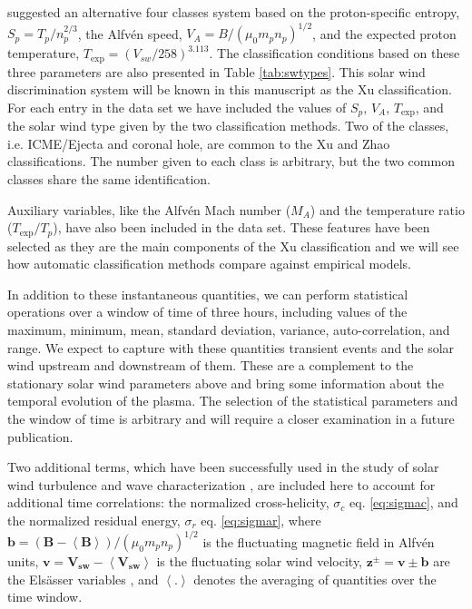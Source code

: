 \citep{Xu2015b} suggested an alternative four classes system based on the proton-specific entropy, $S_p = T_p/n_p^{2/3}$, the Alfv\'en speed, $V_A = B / (\mu_0 m_p n_p)^{1/2}$, and the expected proton temperature, $T_\text{exp} = (V_{sw}/258)^{3.113}$. The classification conditions based on these three parameters are also presented in Table \ref{tab:swtypes}. This solar wind discrimination system will be known in this manuscript as the Xu classification\citep{Xu2015b}. For each entry in the data set we have included the values of $S_p$, $V_A$, $T_\text{exp}$, and the solar wind type given by the two classification methods. Two of the classes, i.e. ICME/Ejecta and coronal hole, are common to the Xu and Zhao classifications. The number given to each class is arbitrary, but the two common classes share the same identification.

Auxiliary variables, like the Alfv\'en Mach number ($M_A$) and the temperature ratio ($T_\text{exp}/T_p$), have also been included in the data set. These features have been selected as they are the main components of the Xu classification and we will see how automatic classification methods compare against empirical models.

In addition to these instantaneous quantities, we can perform statistical operations over a window of time of three hours, including values of the maximum, minimum, mean, standard deviation, variance, auto-correlation, and range. We expect to capture with these quantities transient events and the solar wind upstream and downstream of them. These are a complement to the stationary solar wind parameters above and bring some information about the temporal evolution of the plasma. The selection of the statistical parameters and the window of time is arbitrary and will require a closer examination in a future publication.

Two additional terms, which have been successfully used in the study of solar wind turbulence and wave characterization \citep{Zhao2018,Adhikari2020,Magyar2019,DAmicis2015}, are included here to account for additional time correlations: the normalized cross-helicity, $\sigma_c$ eq. \eqref{eq:sigmac}, and the normalized residual energy, $\sigma_r$ eq. \eqref{eq:sigmar}, where $\boldsymbol{b} = \left(\boldsymbol{B}- \boldsymbol{\left<B\right>}\right)/(\mu_0m_pn_p)^{1/2}$ is the fluctuating magnetic field in Alfv\'en units, $\boldsymbol{v} = \boldsymbol{V_{sw}}- \boldsymbol{\left<V_{sw}\right>}$ is the fluctuating solar wind velocity, $\boldsymbol{z^\pm} = \boldsymbol{v} \pm \boldsymbol{b}$ are the Els\"asser variables \citep{PhysRev.79.183}, and $\left<.\right>$ denotes the averaging of quantities over the time window.

